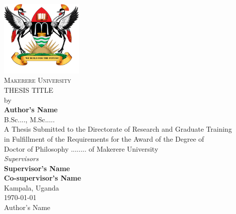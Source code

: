 \begin{titlepage}
    \centering
    \includegraphics[width=0.3\textwidth]{images/Mak-Log.png}\\[0.1cm] %
    {\huge \textsc{Makerere University}}\\[2cm] %

    {\MakeUppercase{ \Large Thesis Title}}\\[1cm] %

    {by}\\[0.5cm]
    {\textbf{\large Author's Name}\\[0.1cm]
    B.Sc...., M.Sc.....}\\[2cm] %
    A Thesis Submitted to the Directorate of Research and Graduate Training\\in Fulfillment of the Requirements for the Award of the Degree of \\Doctor of Philosophy ........ of Makerere University\\[2cm]
    
    \emph{\large Supervisors}\\[0.5cm]
    \textbf{Supervisor's Name} \\[0.5cm]
    \textbf{Co-supervisor's Name}\\[1cm]
    
    {\large Kampala, Uganda}\\[0.5cm] %
    {\today}\\[0.5cm] %

    \vfill %
    {\textcopyright{}  Author's Name \the\year}
\end{titlepage}




